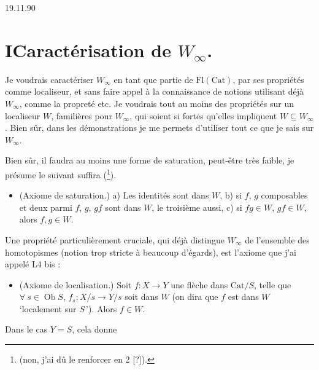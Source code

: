 \documentclass[11pt]{article}
\newcommand{\printedpage}[1]{\marginpar{\footnotesize p.~#1}}
\newcommand{\msp}[1]{\marginpar{\footnotesize [#1]}}
\newcommand{\Cat}{\mathrm{Cat}}
\newcommand{\Ob}{\operatorname{Ob}}
\newcommand{\fl}{\longrightarrow}
\begin{document}
\clearpage

\printedpage{--}


\clearpage

\printedpage{1}

\msp{page 1}

\hfill 19.11.90

\section*{I\quad Caractérisation de $W_\infty$.}

Je voudrais caractériser $W_\infty$ en tant que partie de $\mathrm{Fl}(\Cat)$, par ses propriétés comme localiseur, et sans faire appel à la connaissance de notions utilisant déjà $W_\infty$, comme la propreté etc. Je voudrais tout au moins des propriétés sur un localiseur $W$, familières pour $W_\infty$, qui soient si fortes qu'elles impliquent $W \subseteq W_\infty$. Bien sûr, dans les démonstrations je me permets d'utiliser tout ce que je sais sur $W_\infty$.

Bien sûr, il faudra au moins une forme de saturation, peut-être très faible, je présume le suivant suffira (\footnote{(non, j'ai dû le renforcer en 2 [?]).}).

\begin{itemize}[leftmargin=*]
\item[\textbf{W(1)}] (Axiome de saturation.) a) Les identités sont dans $W$, b) si $f$, $g$ composables et deux parmi $f$, $g$, $gf$ sont dans $W$, le troisième aussi, c) si $fg \in W$, $gf \in W$, alors $f, g \in W$.
\end{itemize}

Une propriété particulièrement cruciale, qui déjà distingue $W_\infty$ de l'ensemble des homotopismes (notion trop stricte à beaucoup d'égards), est l'axiome que j'ai appelé L4 bis :

\begin{itemize}[leftmargin=*]
\item[\textbf{W(2)}] (Axiome de localisation.) Soit $f : X \fl Y$ une flèche dans $\Cat/S$, telle que $\forall\ s \in \Ob S$, $f_s : X/s \fl Y/s$ soit dans $W$ (on dira que $f$ est dans $W$ `localement sur $S$\,'). Alors $f \in W$.
\end{itemize}



Dans le cas $Y = S$, cela donne
\end{document}
